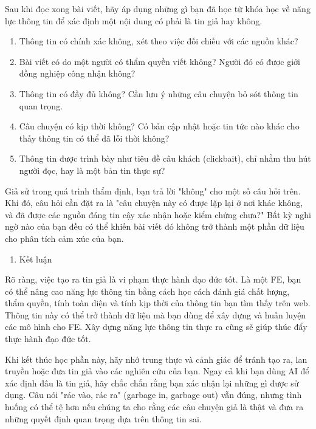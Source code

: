 Sau khi đọc xong bài viết, hãy áp dụng những gì bạn đã học từ khóa học về năng lực thông tin để xác định một nội dung có phải là tin giả hay không.

\begin{enumerate}
\def\labelenumi{\arabic{enumi}.}
\item
  Thông tin có chính xác không, xét theo việc đối chiếu với các nguồn khác?
\item
  Bài viết có do một người có thẩm quyền viết không? Người đó có được giới đồng nghiệp công nhận không?
\item
  Thông tin có đầy đủ không? Cần lưu ý những câu chuyện bỏ sót thông tin quan trọng.
\item
  Câu chuyện có kịp thời không? Có bản cập nhật hoặc tin tức nào khác cho thấy thông tin có thể đã lỗi thời không?
\item
  Thông tin được trình bày như tiêu đề câu khách (clickbait), chỉ nhằm thu hút người đọc, hay là một bản tin thực sự?
\end{enumerate}

Giả sử trong quá trình thẩm định, bạn trả lời "không" cho một số câu hỏi trên. Khi đó, câu hỏi cần đặt ra là "câu chuyện này có được lặp lại ở nơi khác không, và đã được các nguồn đáng tin cậy xác nhận hoặc kiểm chứng chưa?" Bất kỳ nghi ngờ nào của bạn đều có thể khiến bài viết đó không trở thành một phần dữ liệu cho phân tích cảm xúc của bạn.

\begin{enumerate}
\def\labelenumi{\arabic{enumi}.}
\setcounter{enumi}{4}
\item
  Kết luận
\end{enumerate}

Rõ ràng, việc tạo ra tin giả là vi phạm thực hành đạo đức tốt. Là một FE, bạn có thể nâng cao năng lực thông tin bằng cách học cách đánh giá chất lượng, thẩm quyền, tính toàn diện và tính kịp thời của thông tin bạn tìm thấy trên web. Thông tin này có thể trở thành dữ liệu mà bạn dùng để xây dựng và huấn luyện các mô hình cho FE. Xây dựng năng lực thông tin thực ra cũng sẽ giúp thúc đẩy thực hành đạo đức tốt.

Khi kết thúc học phần này, hãy nhớ trung thực và cảnh giác để tránh tạo ra, lan truyền hoặc đưa tin giả vào các nghiên cứu của bạn. Ngay cả khi bạn dùng AI để xác định đâu là tin giả, hãy chắc chắn rằng bạn xác nhận lại những gì được sử dụng. Câu nói "rác vào, rác ra" (garbage in, garbage out) vẫn đúng, nhưng tình huống có thể tệ hơn nếu chúng ta cho rằng các câu chuyện giả là thật và đưa ra những quyết định quan trọng dựa trên thông tin sai.
